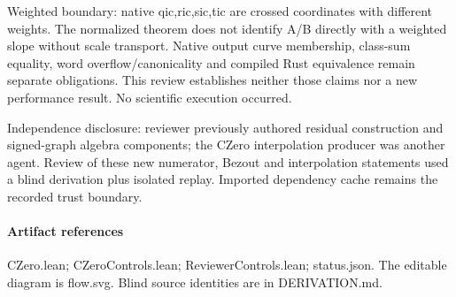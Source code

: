 \documentclass[11pt]{article}
\begin{document}
Weighted boundary: native qic,ric,sic,tic are crossed coordinates with different weights. The normalized theorem does not identify A/B directly with a weighted slope without scale transport. Native output curve membership, class-sum equality, word overflow/canonicality and compiled Rust equivalence remain separate obligations. This review establishes neither those claims nor a new performance result. No scientific execution occurred.\par\medskip
Independence disclosure: reviewer previously authored residual construction and signed-graph algebra components; the CZero interpolation producer was another agent. Review of these new numerator, Bezout and interpolation statements used a blind derivation plus isolated replay. Imported dependency cache remains the recorded trust boundary.\par\medskip
\paragraph{Artifact references} CZero.lean; CZeroControls.lean; ReviewerControls.lean; status.json. The editable diagram is flow.svg. Blind source identities are in DERIVATION.md.
\end{document}
